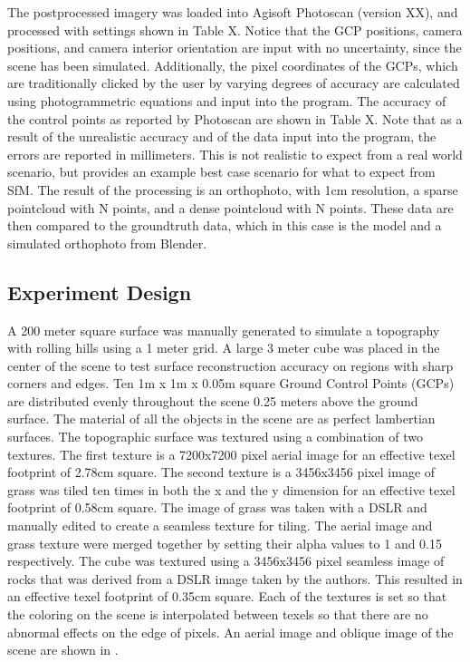The postprocessed imagery was loaded into Agisoft Photoscan (version XX), and processed with settings shown in Table X.  Notice that the GCP positions, camera positions, and camera interior orientation are input with no uncertainty, since the scene has been simulated.  Additionally, the pixel coordinates of the GCPs, which are traditionally clicked by the user by varying degrees of accuracy are calculated using photogrammetric equations and input into the program.  The accuracy of the control points as reported by Photoscan are shown in Table X.  Note that as a result of the unrealistic accuracy and of the data input into the program, the errors are reported in millimeters.  This is not realistic to expect from a real world scenario, but provides an example best case scenario for what to expect from SfM. The result of the processing is an orthophoto, with 1cm resolution, a sparse pointcloud with N points, and a dense pointcloud with N points.  These data are then compared to the groundtruth data, which in this case is the model and a simulated orthophoto from Blender.  

\subsection{Experiment Design}
A 200 meter square surface was manually generated to simulate a topography with rolling hills using a 1 meter grid.  A large 3 meter cube was placed in the center of the scene to test surface reconstruction accuracy on regions with sharp corners and edges.  Ten 1m x 1m x 0.05m square Ground Control Points (GCPs) are distributed evenly throughout the scene 0.25 meters above the ground surface.  The material of all the objects in the scene are as perfect lambertian surfaces.  The topographic surface was textured using a combination of two textures.  The first texture is a 7200x7200 pixel aerial image  for an effective texel footprint of 2.78cm square.  The second texture is a 3456x3456 pixel image of grass was tiled ten times in both the x and the y dimension for an effective texel footprint of 0.58cm square.  The image of grass was taken with a DSLR and manually edited to create a seamless texture for tiling.  The aerial image and grass texture were merged together by setting their alpha values to 1 and 0.15 respectively.  The cube was textured using a 3456x3456 pixel seamless image of rocks that was derived from a DSLR image taken by the authors.  This resulted in an effective texel footprint of 0.35cm square.  Each of the textures is set so that the coloring on the scene is interpolated between texels so that there are no abnormal effects on the edge of pixels.  An aerial image and oblique image of the scene are shown in . 

